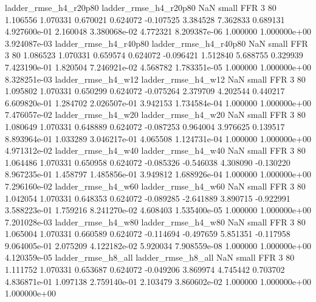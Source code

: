    ladder_rmse_h4_r20p80    ladder_rmse_h4_r20p80                   NaN      small      FFR                 3 80 1.106556       1.070331 0.670021       0.624072   -0.107525      3.384528      7.362833     0.689131   4.927600e-01  2.160048 3.380068e-02     4.772321   8.209387e-06            1.000000    1.000000e+00        3.924087e-03
   ladder_rmse_h4_r40p80    ladder_rmse_h4_r40p80                   NaN      small      FFR                 3 80 1.086523       1.070331 0.659574       0.624072   -0.096421      1.512840      5.688755     0.329939   7.423190e-01  1.820504 7.246921e-02     4.568782   1.783351e-05            1.000000    1.000000e+00        8.328251e-03
      ladder_rmse_h4_w12       ladder_rmse_h4_w12                   NaN      small      FFR                 3 80 1.095802       1.070331 0.650299       0.624072   -0.075264      2.379709      4.202544     0.440217   6.609820e-01  1.284702 2.026507e-01     3.942153   1.734584e-04            1.000000    1.000000e+00        7.476057e-02
      ladder_rmse_h4_w20       ladder_rmse_h4_w20                   NaN      small      FFR                 3 80 1.080649       1.070331 0.648889       0.624072   -0.087253      0.964004      3.976625     0.139517   8.893964e-01  1.033289 3.046217e-01     4.065508   1.124731e-04            1.000000    1.000000e+00        4.971312e-02
      ladder_rmse_h4_w40       ladder_rmse_h4_w40                   NaN      small      FFR                 3 80 1.064486       1.070331 0.650958       0.624072   -0.085326     -0.546038      4.308090    -0.130220   8.967235e-01  1.458797 1.485856e-01     3.949812   1.688926e-04            1.000000    1.000000e+00        7.296160e-02
      ladder_rmse_h4_w60       ladder_rmse_h4_w60                   NaN      small      FFR                 3 80 1.042054       1.070331 0.648353       0.624072   -0.089285     -2.641889      3.890715    -0.922991   3.588223e-01  1.759216 8.241270e-02     4.608403   1.535400e-05            1.000000    1.000000e+00        7.201028e-03
      ladder_rmse_h4_w80       ladder_rmse_h4_w80                   NaN      small      FFR                 3 80 1.065004       1.070331 0.660589       0.624072   -0.114694     -0.497659      5.851351    -0.117958   9.064005e-01  2.075209 4.122182e-02     5.920034   7.908559e-08            1.000000    1.000000e+00        4.120359e-05
      ladder_rmse_h8_all       ladder_rmse_h8_all                   NaN      small      FFR                 3 80 1.111752       1.070331 0.653687       0.624072   -0.049206      3.869974      4.745442     0.703702   4.836871e-01  1.097138 2.759140e-01     2.103479   3.860602e-02            1.000000    1.000000e+00        1.000000e+00
